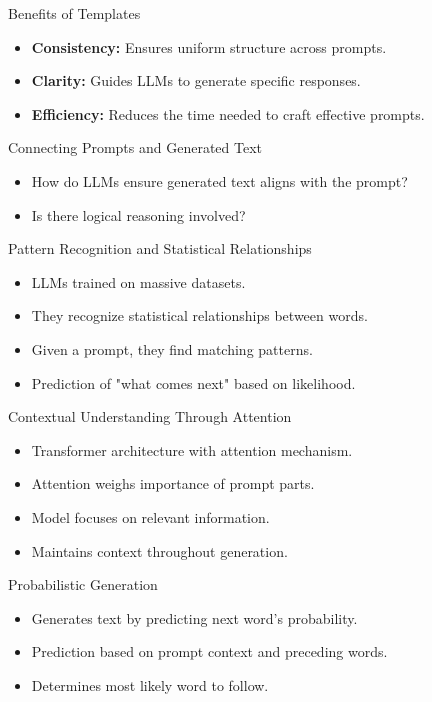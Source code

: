 \begin{frame}{Benefits of Templates}
    \begin{itemize}
        \item \textbf{Consistency:} Ensures uniform structure across prompts.
        \item \textbf{Clarity:} Guides LLMs to generate specific responses.
        \item \textbf{Efficiency:} Reduces the time needed to craft effective prompts.
    \end{itemize}
\end{frame}


\begin{frame}{Connecting Prompts and Generated Text}
  \begin{itemize}
    \item How do LLMs ensure generated text aligns with the prompt?
    \item Is there logical reasoning involved?
  \end{itemize}
\end{frame}

\begin{frame}{Pattern Recognition and Statistical Relationships}
  \begin{itemize}
    \item LLMs trained on massive datasets.
    \item They recognize statistical relationships between words.
    \item Given a prompt, they find matching patterns.
    \item Prediction of "what comes next" based on likelihood.
  \end{itemize}
\end{frame}

\begin{frame}{Contextual Understanding Through Attention}
  \begin{itemize}
    \item Transformer architecture with attention mechanism.
    \item Attention weighs importance of prompt parts.
    \item Model focuses on relevant information.
    \item Maintains context throughout generation.
  \end{itemize}
\end{frame}

\begin{frame}{Probabilistic Generation}
  \begin{itemize}
    \item Generates text by predicting next word's probability.
    \item Prediction based on prompt context and preceding words.
    \item Determines most likely word to follow.
  \end{itemize}
\end{frame}

